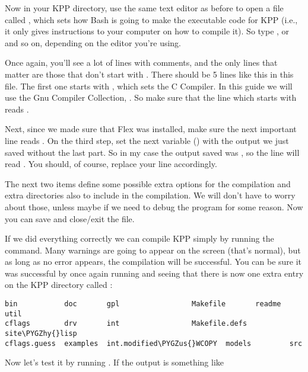 \documentclass[letterpaper,10pt,openany,oneside]{sphinxmanual}
\def\PYGZus{\char`\_}
\def\PYGZhy{\char`\-}
\begin{document}
Now in your KPP directory, use the same text editor as before to open a file
called , which sets how Bash is going to make the executable
code for KPP (i.e., it only gives instructions to your computer on how to
compile it). So type , or  and so
on, depending on the editor you're using.

Once again, you'll see a lot of lines with comments, and the only lines that
matter are those that don't start with \sphinxcode{\#}. There should be 5 lines like this
in this file. The first one starts with , which sets the C Compiler. In
this guide we will use the Gnu Compiler Collection, . So make sure that
the line which starts with  reads .

Next, since we made sure that Flex was installed, make sure the next important
line reads . On the third step, set the next variable
() with the output we just saved without the last part. So in
my case the output saved was , so the line
will read . You should, of course,
replace your line accordingly.

The next two items define some possible extra options for the compilation and
extra directories also to include in the compilation. We will don't have to
worry about those, unless maybe if we need to debug the program for some
reason. Now you can save and close/exit the file.

If we did everything correctly we can compile KPP simply by running the
 command. Many warnings are going to appear on the screen (that's
normal), but as long as no error appears, the compilation will be successful.
You can be sure it was successful by once again running  and seeing that
there is now one extra entry on the KPP directory called :

\begin{Verbatim}[commandchars=\\\{\}]
bin           doc       gpl                 Makefile       readme     util
cflags        drv       int                 Makefile.defs  site\PYGZhy{}lisp
cflags.guess  examples  int.modified\PYGZus{}WCOPY  models         src
\end{Verbatim}

Now let's test it by running . If the output is something like
\end{document}
